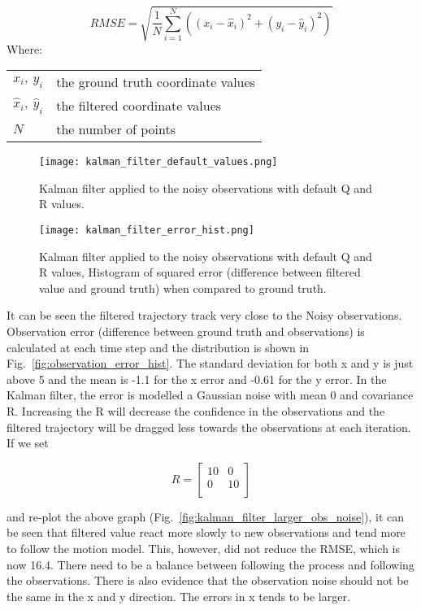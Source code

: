 \documentclass{report}
\makeatletter
\newenvironment{conditions}
  {\par\vspace{\abovedisplayskip}\noindent\begin{tabular}{>{$}l<{$} @{${}={}$} l}}
  {\end{tabular}\par\vspace{\belowdisplayskip}}
\makeatother
\begin{document}
\begin{equation}
    RMSE = \sqrt{\frac{1}{N} \sum_{i=1}^{N} ((x_{i} - \hat{x}_{i})^2 + (y_{i} - \hat{y}_{i})^2)}
    \label{eq:rmse}
\end{equation}
Where:
\begin{conditions}
 x_{i},\ y_{i}             & the ground truth coordinate values \\
 \hat{x}_{i},\ \hat{y}_{i} & the filtered coordinate values \\
 N                       & the number of points
\end{conditions}

\begin{figure}[ht]
    \centering
    \texttt{[image: kalman\_filter\_default\_values.png]}
    \caption{Kalman filter applied to the noisy observations with default Q and R values.}
    \label{fig:kalman_filter_default_values}
\end{figure}

\begin{figure}[ht]
    \centering
    \texttt{[image: kalman\_filter\_error\_hist.png]}
    \caption{Kalman filter applied to the noisy observations with default Q and R values, Histogram of squared error (difference between filtered value and ground truth) when compared to ground truth.}
    \label{fig:kalman_filter_error_hist}
\end{figure}


It can be seen the filtered trajectory track very close to the Noisy observations. 
Observation error (difference between ground truth and observations) is calculated at each time step and the distribution is shown in Fig.~\ref{fig:observation_error_hist}. The standard deviation for both x and y is just above 5 and the mean is -1.1 for the x error and -0.61 for the y error. In the Kalman filter, the error is modelled a Gaussian noise with mean 0 and covariance R. Increasing the R will decrease the confidence in the observations and the filtered trajectory will be dragged less towards the observations at each iteration. If we set

\[R = \begin{bmatrix} 
    10 & 0 \\
    0 & 10 \\
\end{bmatrix}\]

and re-plot the above graph (Fig.~\ref{fig:kalman_filter_larger_obs_noise}), it can be seen that filtered value react more slowly to new observations and tend more to follow the motion model. This, however, did not reduce the RMSE, which is now 16.4. There need to be a balance between following the process and following the observations. There is also evidence that the observation noise should not be the same in the x and y direction. The errors in x tends to be larger.
\end{document}
